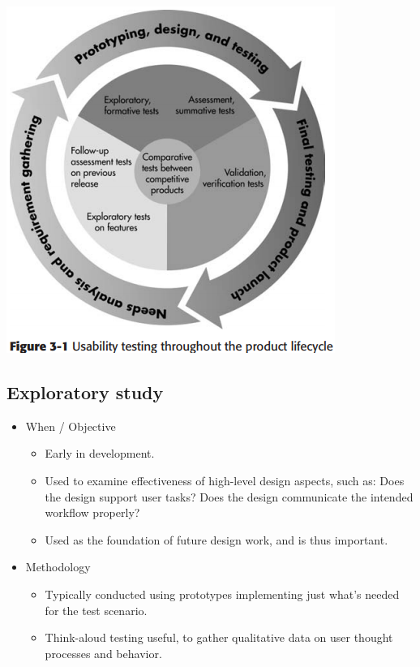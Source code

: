\includegraphics[width=\linewidth]{figures/evaltechcycle.png}

\subsection{Exploratory study}
\begin{itemize}
	\item When / Objective
	\begin{itemize}
		\item Early in development.
		\item Used to examine effectiveness of high-level design aspects, such as: Does the design support user tasks? Does the design communicate the intended workflow properly? 
		\item Used as the foundation of future design work, and is thus important.
	\end{itemize}
	\item Methodology
	\begin{itemize}
		\item Typically conducted using prototypes implementing just what's needed for the test scenario.
		\item Think-aloud testing useful, to gather qualitative data on user thought processes and behavior.
	\end{itemize}
\end{itemize}

